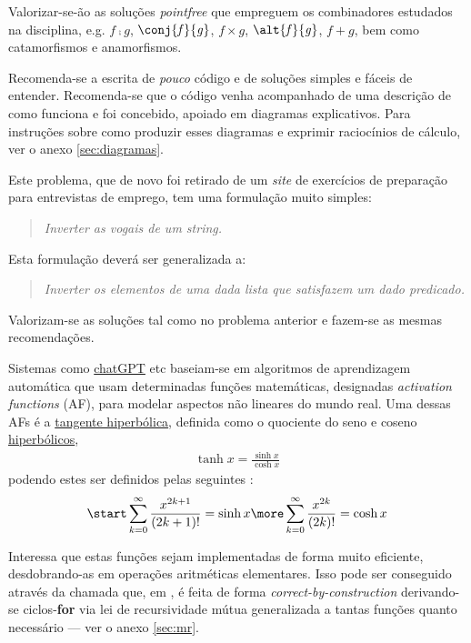 \documentclass[11pt, a4paper, fleqn]{article}
\newcommand{\Varid}[1]{\mathit{#1}}
\begin{document}
\noindent
Valorizar-se-ão as soluções \emph{pointfree} que empreguem os combinadores
estudados na disciplina, e.g. \ensuremath{\Varid{f}\comp \Varid{g}}, \ensuremath{\conj{\Varid{f}}{\Varid{g}}}, \ensuremath{\Varid{f}\times\Varid{g}}, \ensuremath{\alt{\Varid{f}}{\Varid{g}}}, \ensuremath{\Varid{f}\mathbin{+}\Varid{g}}, bem como
catamorfismos e anamorfismos. 

Recomenda-se a escrita de \emph{pouco} código e de soluções simples
e fáceis de entender. Recomenda-se que o código venha acompanhado de uma
descrição de como funciona e foi concebido, apoiado em diagramas explicativos.
Para instruções sobre como produzir esses diagramas e exprimir raciocínios
de cálculo, ver o anexo \ref{sec:diagramas}.

\Problema

Este problema, que de novo foi retirado de um \emph{site} de exercícios de preparação para entrevistas de emprego, tem uma formulação muito simples:
\begin{quote}\em
Inverter as vogais de um \emph{string}.
\end{quote}
Esta formulação deverá ser generalizada a:
\begin{quote}\em
Inverter os elementos de uma dada lista que satisfazem um dado predicado.
\end{quote}

\noindent
Valorizam-se as soluções tal como no problema anterior e fazem-se as mesmas
recomendações.

\Problema

Sistemas como \href{https://chat.openai.com/}{chatGPT} etc baseiam-se em
algoritmos de aprendizagem automática que usam determinadas funções matemáticas,
designadas \emph{activation functions} (AF), para modelar aspectos não li\-neares
do mundo real. Uma dessas AFs é a
\href{https://www.ml-science.com/tanh-activation-function}{tangente hiperbólica},
definida como o quociente do seno e coseno
\href{https://en.wikipedia.org/wiki/Hyperbolic_functions}{hiperbólicos}, 
\begin{eqnarray}
	\tanh x = \frac{\sinh x}{\cosh x}
	\label{eq:tanh}
\end{eqnarray}
podendo estes ser definidos pelas seguintes :
\begin{eqnarray}
\start
	\sum_{k=0}^\infty \frac{x^{2k+1}}{(2k+1)!}=\sinh x
	\label{eq:sinh}
\more
	\sum_{k=0}^\infty \frac{x^{2k}}{(2k)!}=\cosh x
	\nonumber
\end{eqnarray}

Interessa que estas funções sejam implementadas de forma muito eficiente,
desdobrando-as em ope\-rações aritméticas elementares. Isso pode ser conseguido
através da chamada  que, em ,
é feita de forma \emph{correct-by-construction} derivando-se ciclos-\textbf{for} via
lei de recursividade mútua generalizada a tantas funções quanto necessário
--- ver o anexo \ref{sec:mr}. 
\end{document}
